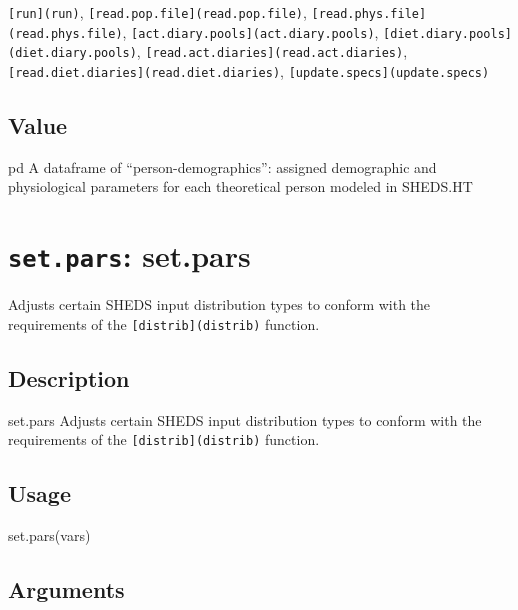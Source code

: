 \documentclass[
]{article}
\newenvironment{Shaded}{\begin{snugshade}}{\end{snugshade}}
\newcommand{\FunctionTok}[1]{\textcolor[rgb]{0.00,0.00,0.00}{#1}}
\newcommand{\NormalTok}[1]{#1}
\begin{document}
\texttt{{[}run{]}(run)}, \texttt{{[}read.pop.file{]}(read.pop.file)},
\texttt{{[}read.phys.file{]}(read.phys.file)},
\texttt{{[}act.diary.pools{]}(act.diary.pools)},
\texttt{{[}diet.diary.pools{]}(diet.diary.pools)},
\texttt{{[}read.act.diaries{]}(read.act.diaries)},
\texttt{{[}read.diet.diaries{]}(read.diet.diaries)},
\texttt{{[}update.specs{]}(update.specs)}

\hypertarget{value-32}{%
\subsection{Value}\label{value-32}}

pd A dataframe of ``person-demographics'': assigned demographic and
physiological parameters for each theoretical person modeled in SHEDS.HT

\hypertarget{set.pars-set.pars}{%
\section{\texorpdfstring{\texttt{set.pars}:
set.pars}{set.pars: set.pars}}\label{set.pars-set.pars}}

Adjusts certain SHEDS input distribution types to conform with the
requirements of the \texttt{{[}distrib{]}(distrib)} function.

\hypertarget{description-50}{%
\subsection{Description}\label{description-50}}

set.pars Adjusts certain SHEDS input distribution types to conform with
the requirements of the \texttt{{[}distrib{]}(distrib)} function.

\hypertarget{usage-50}{%
\subsection{Usage}\label{usage-50}}

\begin{Shaded}
\begin{Highlighting}[]
\FunctionTok{set.pars}\NormalTok{(vars)}
\end{Highlighting}
\end{Shaded}

\hypertarget{arguments-35}{%
\subsection{Arguments}\label{arguments-35}}
\end{document}
